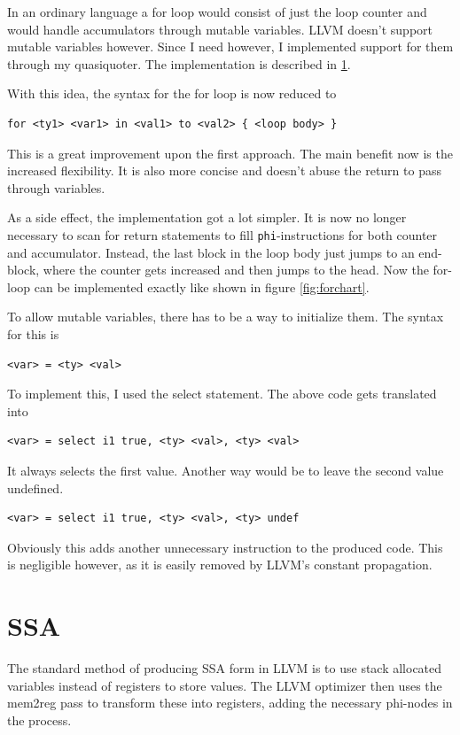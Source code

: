 \documentclass[a4paper,bibliography=totocnumbered,parskip,headsepline]{scrbook}
\begin{document}
In an ordinary language a for loop would consist of just the loop counter and would handle accumulators through mutable variables.
LLVM doesn't support mutable variables however.
Since I need however, I implemented support for them through my quasiquoter.
The implementation is described in \ref{sec:ssa}.

With this idea, the syntax for the for loop is now reduced to
\begin{lstlisting}[numbers=none]
for <ty1> <var1> in <val1> to <val2> { <loop body> }
\end{lstlisting}
This is a great improvement upon the first approach.
The main benefit now is the increased flexibility.
It is also more concise and doesn't abuse the return to pass through variables.

As a side effect, the implementation got a lot simpler.
It is now no longer necessary to scan for return statements to fill \lstinline!phi!-instructions for both counter and accumulator.
Instead, the last block in the loop body just jumps to an end-block, where the counter gets increased and then jumps to the head.
Now the for-loop can be implemented exactly like shown in figure \ref{fig:forchart}.

To allow mutable variables, there has to be a way to initialize them.
The syntax for this is
\begin{lstlisting}[numbers=none]
 <var> = <ty> <val>
\end{lstlisting}
To implement this, I used the select statement.
The above code gets translated into
\begin{lstlisting}[numbers=none]
 <var> = select i1 true, <ty> <val>, <ty> <val>
\end{lstlisting}
It always selects the first value.
Another way would be to leave the second value undefined.
\begin{lstlisting}[numbers=none]
 <var> = select i1 true, <ty> <val>, <ty> undef
\end{lstlisting}
Obviously this adds another unnecessary instruction to the produced code.
This is negligible however, as it is easily removed by LLVM's constant propagation.

\section{SSA}
\label{sec:ssa}
The standard method of producing SSA form in LLVM is to use stack allocated variables instead of registers to store values.
The LLVM optimizer then uses the mem2reg pass to transform these into registers, adding the necessary phi-nodes in the process.
\end{document}
